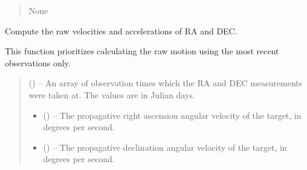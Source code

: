 \documentclass[letterpaper,11pt,english]{sphinxmanual}
\begin{document}
\begin{savenotes}
\begin{fulllineitems}
\begin{savenotes}
\begin{fulllineitems}
\begin{quote}
\begin{description}
\begin{itemize}
\end{itemize}

\sphinxAtStartPar
None

\end{description}\end{quote}

\end{fulllineitems}\end{savenotes}


\begin{savenotes}\begin{fulllineitems}
\label{\detokenize{code/opihiexarata.propagate.solution:opihiexarata.propagate.solution.PropagativeSolution.__init_compute_propagation_motion}}
\pysigstartsignatures
{}
\pysigstopsignatures
\sphinxAtStartPar
Compute the raw velocities and accelerations of RA and DEC.

\sphinxAtStartPar
This function prioritizes calculating the raw motion using the most
recent observations only.
\begin{quote}\begin{description}
\sphinxAtStartPar
{} () – An array of observation times which the RA and DEC measurements
were taken at. The values are in Julian days.

\sphinxAtStartPar
\begin{itemize}
\item {} 
\sphinxAtStartPar
{} () – The propagative right ascension angular velocity of the target, in degrees
per second.

\item {} 
\sphinxAtStartPar
{} () – The propagative declination angular velocity of the target, in degrees per
second.


\end{itemize}
\end{description}
\end{quote}
\end{fulllineitems}
\end{savenotes}
\end{fulllineitems}
\end{savenotes}
\end{document}
